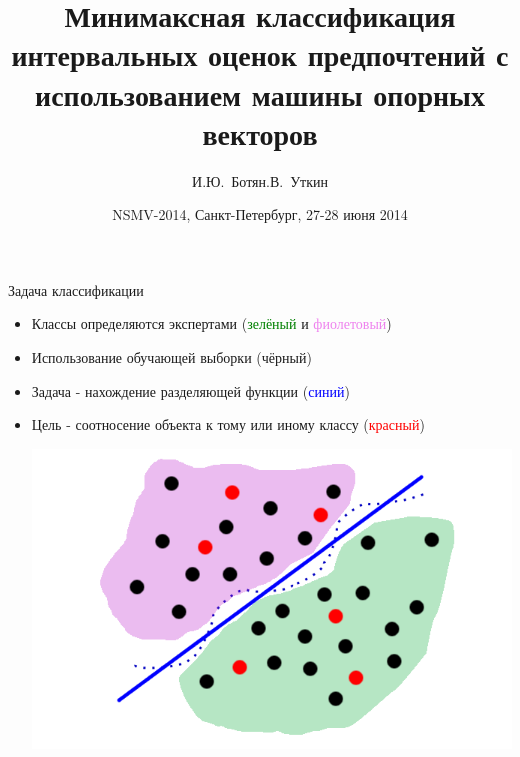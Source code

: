 \documentclass[11pt]{beamer}
\title[]{Минимаксная классификация интервальных оценок предпочтений с использованием машины опорных векторов}
\author[И.Ю.~Ботян, Л.В.~Уткин]{И.Ю.~Ботян\andЛ.В.~Уткин}
\institute[СПбГЛТУ]{\large Санкт-Петербургский государственный лесотехнический университет}
\date[NSMV-2014]{\large NSMV-2014, Санкт-Петербург, 27-28 июня 2014}
\begin{document}
\graphicspath{ {./img/} }

\begin{frame}

\titlepage

\end{frame}
\begin{frame}{Задача классификации}

\begin{itemize}
	\item Классы определяются экспертами (\textcolor{green}{зелёный} и \textcolor{violet}{фиолетовый})
	\item Использование обучающей выборки (чёрный)
	\item Задача - нахождение разделяющей функции (\textcolor{blue}{синий})
	\item Цель - соотносение объекта к тому или иному классу (\textcolor{red}{красный})
	\begin{center}
		\includegraphics[scale=0.35]{classification}
	\end{center}
\end{itemize}

\end{frame}
\end{document}
